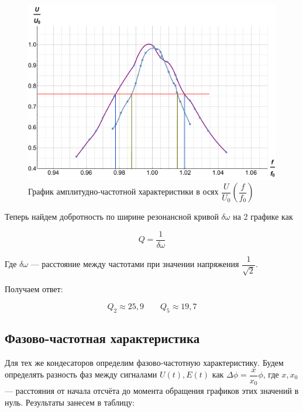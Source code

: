 \documentclass[12pt]{kiarticle} %
\begin{document}
\begin{figure}[h!]
	\includegraphics[scale=0.5]{fff.pdf}
	\caption{График амплитудно-частотной характеристики в осях $ \dfrac{U}{U_0} \left( \dfrac{f}{f_0} \right) $ }
\end{figure}

Теперь найдем добротность по ширине резонансной кривой $ \delta\omega $ на 2 графике как 

\begin{equation}\label{}
Q = \dfrac{1}{\delta\omega}
\end{equation}  

Где $ \delta\omega $ --- расстояние между частотами при значении напряжения $ \dfrac{1}{\sqrt{2}} $.

Получаем ответ: 

\begin{equation}\label{}
Q_2 \approx 25,9 \qquad Q_5 \approx 19,7
\end{equation}

\subsection{Фазово-частотная характеристика}

Для тех же кондесаторов определим фазово-частотную характеристику. Будем определять разность фаз между сигналами $ U(t), E(t) $ как $ \Delta\phi = \dfrac{x}{x_0}\phi $, где $ x, x_0 $ --- расстояния от начала отсчёта до момента обращения графиков этих значений в нуль. Результаты занесем в таблицу:
\end{document}
